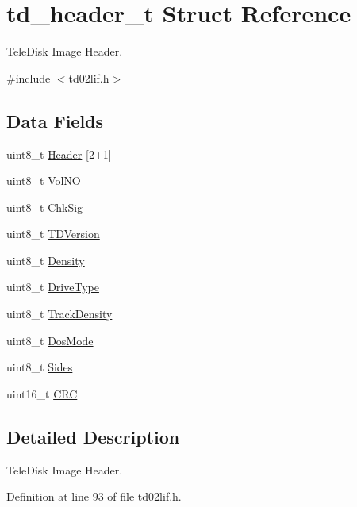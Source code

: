 \hypertarget{structtd__header__t}{}\section{td\+\_\+header\+\_\+t Struct Reference}
\label{structtd__header__t}


Tele\+Disk Image Header.  




{\ttfamily \#include $<$td02lif.\+h$>$}

\subsection*{Data Fields}
\begin{DoxyCompactItemize}
\item 
uint8\+\_\+t \hyperlink{structtd__header__t_a41510629d6bb7852f4e1e43443c38edd}{Header} \mbox{[}2+1\mbox{]}
\item 
uint8\+\_\+t \hyperlink{structtd__header__t_a081c4518281071d65fe82f6c8260b1f5}{Vol\+NO}
\item 
uint8\+\_\+t \hyperlink{structtd__header__t_ad226c52f8f8481b0ebf826dd3128ba3d}{Chk\+Sig}
\item 
uint8\+\_\+t \hyperlink{structtd__header__t_ac63e3625279d7262e3d094c0c5e5753a}{T\+D\+Version}
\item 
uint8\+\_\+t \hyperlink{structtd__header__t_a09c0c52ec99733db61dd6f3c7d052325}{Density}
\item 
uint8\+\_\+t \hyperlink{structtd__header__t_a865bd11809e67fd4ca8f1af0c46d9600}{Drive\+Type}
\item 
uint8\+\_\+t \hyperlink{structtd__header__t_a2d1461bb956665d519d33fca629477ab}{Track\+Density}
\item 
uint8\+\_\+t \hyperlink{structtd__header__t_acb0710bd6f98290ea2490ce678b63894}{Dos\+Mode}
\item 
uint8\+\_\+t \hyperlink{structtd__header__t_a8b188d880b5d9d94122674265b0ca3e6}{Sides}
\item 
uint16\+\_\+t \hyperlink{structtd__header__t_ae51197a200b65947359773f1aeea9c2d}{C\+RC}
\end{DoxyCompactItemize}


\subsection{Detailed Description}
Tele\+Disk Image Header. 

Definition at line 93 of file td02lif.\+h.



